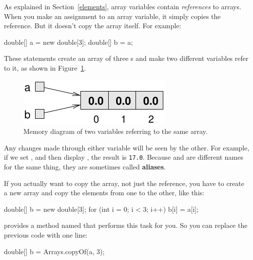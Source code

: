 As explained in Section~\ref{elements}, array variables contain {\em references} to arrays.
When you make an assignment to an array variable, it simply copies the reference.
But it doesn't copy the array itself.
For example:

\begin{code}
double[] a = new double[3];
double[] b = a;
\end{code}

These statements create an array of three s and make two different variables refer to it, as shown in Figure~\ref{fig.array3}.


\begin{figure}[!ht]
\begin{center}
\includegraphics{figs/array3.pdf}
\caption{Memory diagram of two variables referring to the same array.}
\label{fig.array3}
\end{center}
\end{figure}


Any changes made through either variable will be seen by the other.
For example, if we set , and then display , the result is {\tt 17.0}.
Because  and  are different names for the same thing, they are sometimes called {\bf aliases}.

If you actually want to copy the array, not just the reference, you have to create a new array and copy the elements from one to the other, like this:

\begin{code}
double[] b = new double[3];
for (int i = 0; i < 3; i++) {
    b[i] = a[i];
}
\end{code}


 provides a method named  that performs this task for you.
So you can replace the previous code with one line:

\begin{code}
double[] b = Arrays.copyOf(a, 3);
\end{code}

